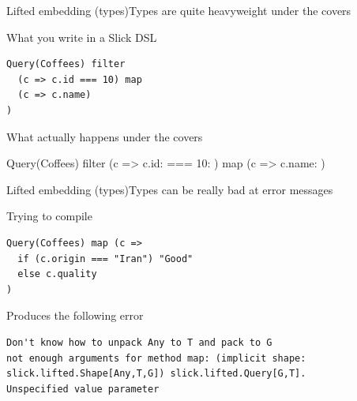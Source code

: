 \documentclass{beamer}
\begin{document}
\begin{frame}[fragile]{Lifted embedding (types)}{Types are quite heavyweight under the covers}
  \vspace{1em}
  \begin{exampleblock}{What you write in a Slick DSL}
    \begin{verbatim}
Query(Coffees) filter
  (c => c.id === 10) map
  (c => c.name)
)
    \end{verbatim}
  \end{exampleblock}

  \begin{alertblock}{What actually happens under the covers}
    \begin{semiverbatim}
Query(Coffees) filter
  (c => c.id: \text{\color{blue}{Column[Int]}} === 10: \text{\color{blue}{Column[Int]}}) map
  (c => c.name: \text{\color{blue}{Column[String]}})
    \end{semiverbatim}
  \end{alertblock}

\end{frame}

\begin{frame}[fragile]{Lifted embedding (types)}{Types can be really bad at error messages}
  \vspace{1em}
  \begin{exampleblock}{Trying to compile}
    \begin{verbatim}
Query(Coffees) map (c =>
  if (c.origin === "Iran") "Good"
  else c.quality
)\end{verbatim}
  \end{exampleblock}

  \vspace{1em}
  \begin{alertblock}{Produces the following error}
    \begin{verbatim}
Don't know how to unpack Any to T and pack to G
not enough arguments for method map: (implicit shape:
slick.lifted.Shape[Any,T,G]) slick.lifted.Query[G,T].
Unspecified value parameter
    \end{verbatim}
  \end{alertblock}

\end{frame}
\end{document}
